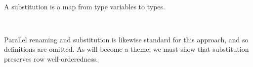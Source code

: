 \documentclass[authoryear, acmsmall, screen, review, nonacm]{acmart}
\begin{document}
\begin{code}[hide]
\>[0]\AgdaSpace{}%
\AgdaSymbol{:}\AgdaSpace{}%
\AgdaSpace{}%
\AgdaSpace{}%
\AgdaSpace{}%
\AgdaOperator{\AgdaInductiveConstructor{R[}}\AgdaSpace{}%
\AgdaSpace{}%
\AgdaOperator{\AgdaInductiveConstructor{]}}\AgdaSpace{}%
\AgdaSpace{}%
\AgdaSpace{}%
\AgdaSpace{}%
\AgdaSymbol{(}\AgdaSpace{}%
\AgdaOperator{\AgdaInductiveConstructor{,,}}\AgdaSpace{}%
\AgdaSymbol{)}\AgdaSpace{}%
\AgdaOperator{\AgdaInductiveConstructor{R[}}\AgdaSpace{}%
\AgdaSpace{}%
\AgdaOperator{\AgdaInductiveConstructor{]}}\<%
\\
\>[0]\AgdaSpace{}%
\AgdaSymbol{=}\AgdaSpace{}%
\AgdaSpace{}%
\<%
\end{code}

A substitution is a map from type variables to types.

\begin{code}%
\>[0]\AgdaSpace{}%
\AgdaSymbol{:}\AgdaSpace{}%
\AgdaSpace{}%
\AgdaSpace{}%
\AgdaSpace{}%
\AgdaSpace{}%
\<%
\\
\>[0]\AgdaSpace{}%
\AgdaSpace{}%
\AgdaSpace{}%
\AgdaSymbol{=}\AgdaSpace{}%
\AgdaSpace{}%
\AgdaSymbol{\{}\AgdaSymbol{\}}\AgdaSpace{}%
\AgdaSpace{}%
\AgdaSpace{}%
\AgdaSpace{}%
\AgdaSpace{}%
\AgdaSpace{}%
\AgdaSpace{}%
\AgdaSpace{}%
\<%
\end{code}

\Ni Parallel renaming and substitution is likewise standard for this approach, and so definitions are omitted. As will become a theme, we must show that substitution preserves row well-orderedness.
\end{document}
